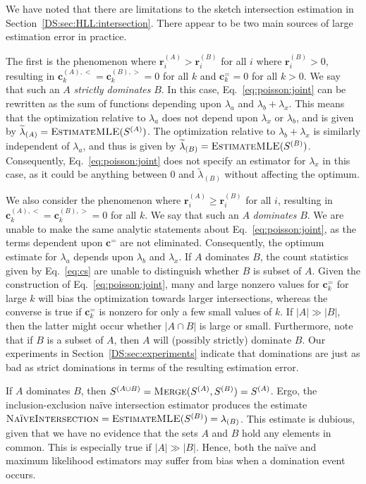 \documentclass[10]{article}
\newcommand{\algoname}[1]{\textnormal{\textsc{#1}}}
\begin{document}
We have noted that there are limitations to the sketch intersection estimation in Section~\ref{DS:sec:HLL:intersection}.
There appear to be two main sources of large estimation error in practice.

The first is the phenomenon where $\mathbf{r}^{(A)}_i > \mathbf{r}^{(B)}_i$ for all $i$ where $\mathbf{r}^{(B)}_i > 0$, resulting in  $\mathbf{c}^{(A),<}_k = \mathbf{c}^{(B),>}_k = 0$ for all $k$ and $\mathbf{c}^{=}_k = 0$ for all $k > 0$. 
We say that such an $A$ \emph{strictly dominates} $B$. 
In this case, Eq.~\eqref{eq:poisson:joint} can be rewritten as the sum of functions depending upon $\lambda_a$ and $\lambda_b + \lambda_x$. 
This means that the optimization relative to $\lambda_a$ does not depend upon $\lambda_x$ or $\lambda_b$, and is given by $\widetilde{\lambda}_{(A)} = \algoname{EstimateMLE}(S^{(A)})$.
The optimization relative to $\lambda_b + \lambda_x$ is similarly independent of $\lambda_a$, and thus is given by $\widetilde{\lambda}_{(B)} = \algoname{EstimateMLE}(S^{(B)})$.
Consequently, Eq.~\eqref{eq:poisson:joint} does not specify an estimator for $\lambda_x$ in this case, as it could be anything between 0 and $\widetilde{\lambda}_{(B)}$ without affecting the optimum.

We also consider the phenomenon where $\mathbf{r}^{(A)}_i \geq \mathbf{r}^{(B)}_i$ for all $i$, resulting in  $\mathbf{c}^{(A),<}_k = \mathbf{c}^{(B),>}_k = 0$ for all $k$. 
We say that such an $A$ \emph{dominates} $B$. 
We are unable to make the same analytic statements about Eq.~\eqref{eq:poisson:joint}, as the terms dependent upon $\mathbf{c}^{=}$ are not eliminated.
Consequently, the optimum estimate for $\lambda_a$ depends upon $\lambda_b$ and $\lambda_x$. 
If $A$ dominates $B$, the count statistics given by Eq.~\ref{eq:cs} are unable to distinguish whether $B$ is subset of $A$. 
Given the construction of Eq.~\eqref{eq:poisson:joint}, many and large nonzero values for $\mathbf{c}^{=}_k$ for large $k$ will bias the optimization towards larger intersections, whereas the converse is true if $\mathbf{c}^{=}_k$ is nonzero for only a few small values of $k$.
If $|A| \gg |B|$, then the latter might occur whether $|A \cap B|$ is large or small.
Furthermore, note that if $B$ is a subset of $A$, then $A$ will (possibly strictly) dominate $B$. 
Our experiments in Section~\ref{DS:sec:experiments} indicate that dominations are just as bad as strict dominations in terms of the resulting estimation error.

If $A$ dominates $B$, then $S^{(A \cup B)} = \algoname{Merge}(S^{(A)}, S^{(B)}) = S^{(A)}$.
Ergo, the inclusion-exclusion na\"ive intersection estimator produces the estimate $\algoname{Na\"iveIntersection} = \algoname{EstimateMLE}(S^{(B)}) = \lambda_{(B)}$.
This estimate is dubious, given that we have no evidence that the sets $A$ and $B$ hold any elements in common. 
This is especially true if $|A| \gg |B|$.
Hence, both the na\"ive and maximum likelihood estimators may suffer from bias when a domination event occurs.
\end{document}
